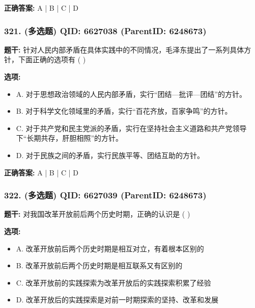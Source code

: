 \documentclass[12pt,UTF8]{ctexart}
\begin{document}
\textbf{正确答案:}
A | B | C | D

\vspace{0.3em}\hrulefill\vspace{0.7em}

\subsubsection*{321. (多选题) \small QID: 6627038 (ParentID: 6248673)}

\textbf{题干:}
针对人民内部矛盾在具体实践中的不同情况，毛泽东提出了一系列具体方针，下面正确的选项有 ( )



\textbf{选项:}
\begin{itemize}[leftmargin=*]

  \item A. 对于思想政治领域的人民内部矛盾，实行“团结—批评—团结”的方针。

  \item B. 对于科学文化领域里的矛盾，实行“百花齐放，百家争鸣”的方针。

  \item C. 对于共产党和民主党派的矛盾，实行在坚持社会主义道路和共产党领导下“长期共存，肝胆相照”的方针。

  \item D. 对于民族之间的矛盾，实行民族平等、团结互助的方针。

\end{itemize}

\textbf{正确答案:}
A | B | C | D

\vspace{0.3em}\hrulefill\vspace{0.7em}

\subsubsection*{322. (多选题) \small QID: 6627039 (ParentID: 6248673)}

\textbf{题干:}
对我国改革开放前后两个历史时期，正确的认识是  ( )



\textbf{选项:}
\begin{itemize}[leftmargin=*]

  \item A. 改革开放前后两个历史时期是相互对立，有着根本区别的

  \item B. 改革开放前后两个历史时期是相互联系又有区别的

  \item C. 改革开放前的实践探索为改革开放后的实践探索积累了经验

  \item D. 改革开放后的实践探索是对前一时期探索的坚持、改革和发展

\end{itemize}
\end{document}
